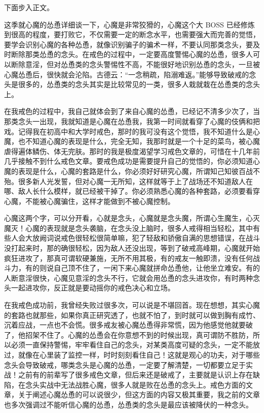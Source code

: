 \begin{case}
\end{case}

下面步入正文。

这季就心魔的怂恿详细谈一下，心魔是非常狡猾的，心魔这个大 BOSS 已经修炼到很高的程度，要打败它，不仅需要一定的断念水平，也需要强大而完善的觉悟，要学会识别心魔的各种怂恿，就像识别骗子的骗术一样，不要认同那类念头，要及时断除那类怂恿的念头。在戒色的过程中，一定要高度警惕心魔的怂恿，很多人可以断除意淫，但对怂恿类的念头警惕性不高，不能很好地识别怂恿的念头，一旦被心魔怂恿后，很快就会沦陷。古德云：“一念稍疏，陷溺难返。”能够导致破戒的念头是很多的，怂恿类的念头其实是比较常见的一类，很多人栽就栽在怂恿类的念头上。

在我戒色的过程中，我自己就体会到了来自心魔的怂恿，已经记不清多少次了，当那类念头一出现，我就知道是心魔在怂恿我，我第一时间就看穿了心魔的伎俩和把戏。记得我在初高中和大学时戒色，那时的我可没有这个觉悟，我不知道什么是心魔，也不知道心魔的表现是什么，完全无知，我那时就是一个十足的菜鸟，被心魔虐得遍体鳞伤、体无完肤。那时的我是极度渴望学习戒色文章的，可惜在十几年前几乎接触不到什么戒色文章。要戒色成功是需要提升自己的觉悟的，你必须知道心魔的表现是什么，心魔的套路是什么，你必须好好研究心魔，所谓知己知彼百战不殆。很多新人光发誓，但对心魔一无所知，这样就等于上了战场还不知道敌人在哪、敌人长什么模样，就已经被干掉了。你必须熟悉心魔的各种套路，必须要看穿心魔，不能被心魔骗住，这样才能做到不被心魔控制。

心魔这两个字，可以分开看，心就是念头，心魔就是念头魔，所谓心生魔生，心灭魔灭！心魔的表现就是念头袭脑，在念头没上脑时，很多人戒得相当轻松，其中有些人会大放阙词说戒色很轻松很简单嘛，犯了轻敌和骄傲自满的思想错误，在战斗没打起来时，那的确很轻松，因为敌人还没出现，等到了破戒高峰期，心魔就开始疯狂进攻了，那真可谓软硬兼施，无所不用其极，有的戒友一触即溃，没有任何战斗力，有的则说自己顶不住了，一闲下来心魔就拼命怂恿他，让他坐立难安。有的人断意淫很快，心魔见意淫的念头不行，它就会用怂恿的念头进攻你，有时两种念头一起进攻你，反正就是要动摇你的戒色决心和立场。

在我戒色成功前，我曾经失败过很多次，可以说是不堪回首。现在想想，其实心魔的套路也就那些，如果你真正研究透了，也就不怕了，到时就可以做到胸有成竹、沉着应战，一点也不会慌。很多戒友被心魔怂恿得非常慌，因为他感觉他就要破了，他招架不住了。心魔的怂恿会在你意想不到的时候出现，真可谓防不胜防，所以必须一直保持警惕，牢牢看住自己的念头，对某类高度可疑的念头，一定不能放过，就像在心里装了监控一样，时时刻刻看住自己！这就是观心的功夫，对于哪些念头会导致破戒，哪类念头是心魔的怂恿，一定要了解清楚，一切都要立足于实战！之前有的前辈写了很多戒色文章，但后来还是破戒了，主要就是认识上存在缺陷，在念头实战中无法战胜心魔，很多人就是败在怂恿的念头上。戒色方面的文章，关于阐述心魔怂恿的可以说很少，但这方面的内容又极其重要，我之前的文章也多次强调过不能听信心魔的怂恿，怂恿类的念头是最应该被降伏的一种念头。

